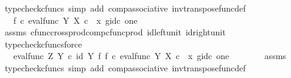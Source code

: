 \begin{isabellebody}
\ {\isacharparenleft}{\kern0pt}typecheck{\isacharunderscore}{\kern0pt}cfuncs{\isacharcomma}{\kern0pt}\ simp\ add{\isacharcolon}{\kern0pt}\ comp{\isacharunderscore}{\kern0pt}associative{}\ inv{\isacharunderscore}{\kern0pt}transpose{\isacharunderscore}{\kern0pt}func{\isacharunderscore}{\kern0pt}def{}{\isacharparenright}{\kern0pt}\isanewline
\ \ \ \ \isamarkupfalse%
\ \isamarkupfalse%
\ {\isachardoublequoteopen}{\isachardot}{\kern0pt}{\isachardot}{\kern0pt}{\isachardot}{\kern0pt}\ {\isacharequal}{\kern0pt}\ f\isactrlsup {\isasymflat}\ {\isasymcirc}\isactrlsub c\ {\isasymlangle}{\isacharparenleft}{\kern0pt}eval{\isacharunderscore}{\kern0pt}func\ Y\ X{\isacharparenright}{\kern0pt}\ {\isasymcirc}\isactrlsub c\ \ {\isasymlangle}x{\isacharcomma}{\kern0pt}\ g{\isasymrangle}{\isacharcomma}{\kern0pt}id\isactrlsub c\ one{\isasymrangle}{\isachardoublequoteclose}\isanewline
\ \ \ \ \ \ \isamarkupfalse%
\ assms\ cfunc{\isacharunderscore}{\kern0pt}cross{\isacharunderscore}{\kern0pt}prod{\isacharunderscore}{\kern0pt}comp{\isacharunderscore}{\kern0pt}cfunc{\isacharunderscore}{\kern0pt}prod\ id{\isacharunderscore}{\kern0pt}left{\isacharunderscore}{\kern0pt}unit{}\ id{\isacharunderscore}{\kern0pt}right{\isacharunderscore}{\kern0pt}unit{}\ \isamarkupfalse%
\ {\isacharparenleft}{\kern0pt}typecheck{\isacharunderscore}{\kern0pt}cfuncs{\isacharcomma}{\kern0pt}force{\isacharparenright}{\kern0pt}\isanewline
\ \ \ \ \isamarkupfalse%
\ \isamarkupfalse%
\ {\isachardoublequoteopen}{\isachardot}{\kern0pt}{\isachardot}{\kern0pt}{\isachardot}{\kern0pt}\ {\isacharequal}{\kern0pt}\ {\isacharparenleft}{\kern0pt}eval{\isacharunderscore}{\kern0pt}func\ Z\ Y{\isacharparenright}{\kern0pt}\ {\isasymcirc}\isactrlsub c\ {\isacharparenleft}{\kern0pt}id\ Y\ {\isasymtimes}\isactrlsub f\ f{\isacharparenright}{\kern0pt}\ {\isasymcirc}\isactrlsub c\ {\isasymlangle}{\isacharparenleft}{\kern0pt}eval{\isacharunderscore}{\kern0pt}func\ Y\ X{\isacharparenright}{\kern0pt}\ {\isasymcirc}\isactrlsub c\ \ {\isasymlangle}x{\isacharcomma}{\kern0pt}\ g{\isasymrangle}{\isacharcomma}{\kern0pt}id\isactrlsub c\ one{\isasymrangle}{\isachardoublequoteclose}\isanewline
\ \ \ \ \ \ \isamarkupfalse%
\ assms\ \isamarkupfalse%
\ {\isacharparenleft}{\kern0pt}typecheck{\isacharunderscore}{\kern0pt}cfuncs{\isacharcomma}{\kern0pt}\ simp\ add{\isacharcolon}{\kern0pt}\ comp{\isacharunderscore}{\kern0pt}associative{}\ inv{\isacharunderscore}{\kern0pt}transpose{\isacharunderscore}{\kern0pt}func{\isacharunderscore}{\kern0pt}def{}{\isacharparenright}{\kern0pt}\isanewline

\end{isabellebody}
